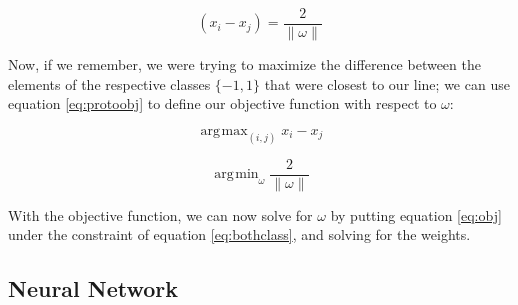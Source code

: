 \documentclass{comjnl}
\newcommand{\norm}[1]{\lVert #1 \rVert}
\DeclareMathOperator*{\argmax}{\arg\!\max}
\DeclareMathOperator*{\argmin}{\arg\!\min}
\numberwithin{equation}{subsection}
\begin{document}
            \begin{equation}\label{eq:protoobj}
                (x_i-x_j)=\frac{2}{\norm{\omega}}
            \end{equation}

            \noindent Now, if we remember, we were trying to maximize the difference between the
            elements of the respective classes $\{-1,1\}$ that were closest to our line; we can use
            equation \eqref{eq:protoobj} to define our objective function with respect to $\omega$:

            \begin{equation*}
                \argmax_{(i,j)} x_i-x_j
            \end{equation*}

            \begin{equation}\label{eq:obj}
                \argmin_{\omega} \frac{2}{\norm{\omega}}
            \end{equation}

            \noindent With the objective function, we can now solve for $\omega$ by putting equation
            \eqref{eq:obj} under the constraint of equation \eqref{eq:bothclass}, and solving for
            the weights.

        \subsection{Neural Network}\label{subsec:nnet}
\end{document}
